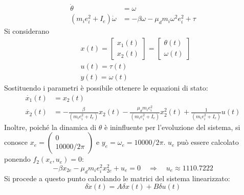 \documentclass[12pt,italian]{article}
\begin{document}
\begin{equation}
    \begin{aligned}
        \dot{\theta} &= \omega\\
        (m_i e_i^2 + I_e)\dot{\omega} &= -\beta \omega - \mu_d m_i \omega^2 e_i^2 + \tau
    \end{aligned}
\end{equation}
Si considerano
\begin{align*}
    &x(t) =
    \begin{bmatrix}
        x_1(t)\\
        x_2(t)
    \end{bmatrix} =
    \begin{bmatrix}
        \theta(t)\\
        \omega(t)
    \end{bmatrix}\\
    &u(t) = \tau(t)\\
    &y(t) = \omega(t)
\end{align*}
Sostituendo i parametri è possibile ottenere le equazioni di stato:
\begin{equation}
    \begin{aligned}
        \dot{x_1}(t) &= x_2(t)\\
        \dot{x_2}(t) &= -\frac{\beta}{(m_i e_i^2 + I_e)} x_2(t) - \frac{\mu_d m_i e_i^2}{(m_i e_i^2 + I_e)} x_2^2(t) + \frac{1}{(m_i e_i^2 + I_e)}u(t)
    \end{aligned}
\end{equation}
\newline
Inoltre, poiché la dinamica di $\theta$ è ininfluente per l'evoluzione del sistema, si conosce $x_e = 
\begin{pmatrix}
    0\\
    10000/2\pi
\end{pmatrix}$
e $y_e = \omega_e = 10000/2\pi$.
$u_e$ può essere calcolato ponendo $f_2(x_e, u_e) = 0$:
\begin{equation*}
    -\beta x_{2e} - \mu_d m_i e_i^2 x_{2e}^2 + u_e = 0 \hspace{1em} \Longrightarrow \hspace{1em} u_e \approx 1110.7222
\end{equation*}
Si procede a questo punto calcolando le matrici del sistema linearizzato:
\begin{equation*}
    \delta \dot{x}(t) = A\delta x(t) + B\delta u(t)
\end{equation*}
\end{document}
